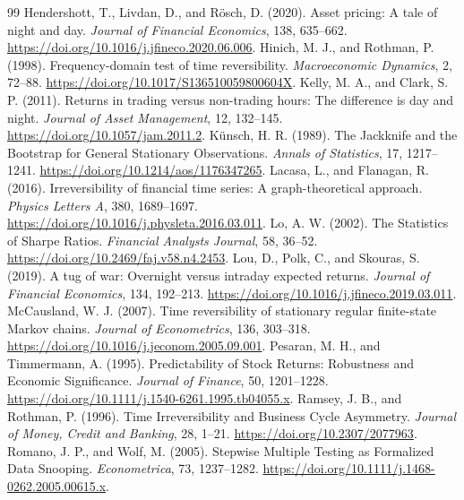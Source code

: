 \begin{thebibliography}{99}
 Hendershott, T., Livdan, D., and Rösch, D. (2020). Asset pricing: A tale of night and day. \textit{Journal of Financial Economics}, 138, 635--662. \url{https://doi.org/10.1016/j.jfineco.2020.06.006}.
 Hinich, M. J., and Rothman, P. (1998). Frequency-domain test of time reversibility. \textit{Macroeconomic Dynamics}, 2, 72--88. \url{https://doi.org/10.1017/S136510059800604X}.
 Kelly, M. A., and Clark, S. P. (2011). Returns in trading versus non-trading hours: The difference is day and night. \textit{Journal of Asset Management}, 12, 132--145. \url{https://doi.org/10.1057/jam.2011.2}.
 Künsch, H. R. (1989). The Jackknife and the Bootstrap for General Stationary Observations. \textit{Annals of Statistics}, 17, 1217--1241. \url{https://doi.org/10.1214/aos/1176347265}.
 Lacasa, L., and Flanagan, R. (2016). Irreversibility of financial time series: A graph-theoretical approach. \textit{Physics Letters A}, 380, 1689--1697. \url{https://doi.org/10.1016/j.physleta.2016.03.011}.
 Lo, A. W. (2002). The Statistics of Sharpe Ratios. \textit{Financial Analysts Journal}, 58, 36--52. \url{https://doi.org/10.2469/faj.v58.n4.2453}.
 Lou, D., Polk, C., and Skouras, S. (2019). A tug of war: Overnight versus intraday expected returns. \textit{Journal of Financial Economics}, 134, 192--213. \url{https://doi.org/10.1016/j.jfineco.2019.03.011}.
 McCausland, W. J. (2007). Time reversibility of stationary regular finite-state Markov chains. \textit{Journal of Econometrics}, 136, 303--318. \url{https://doi.org/10.1016/j.jeconom.2005.09.001}.
 Pesaran, M. H., and Timmermann, A. (1995). Predictability of Stock Returns: Robustness and Economic Significance. \textit{Journal of Finance}, 50, 1201--1228. \url{https://doi.org/10.1111/j.1540-6261.1995.tb04055.x}.
 Ramsey, J. B., and Rothman, P. (1996). Time Irreversibility and Business Cycle Asymmetry. \textit{Journal of Money, Credit and Banking}, 28, 1--21. \url{https://doi.org/10.2307/2077963}.
 Romano, J. P., and Wolf, M. (2005). Stepwise Multiple Testing as Formalized Data Snooping. \textit{Econometrica}, 73, 1237--1282. \url{https://doi.org/10.1111/j.1468-0262.2005.00615.x}.

\end{thebibliography}
